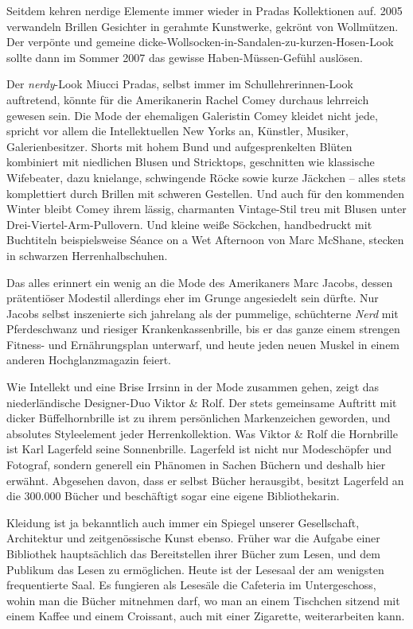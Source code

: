 \documentclass[output=paper]{langscibook}
\begin{document}
Seitdem kehren nerdige Elemente immer wieder in Pradas Kollektionen auf.
2005 verwandeln Brillen Gesichter in gerahmte Kunstwerke, gekrönt von
Wollmützen. Der verpönte und gemeine
dicke-Wollsocken-in-Sandalen-zu-kurzen-Hosen-Look sollte dann im Sommer
2007 das gewisse Haben-Müssen-Gefühl auslösen.

Der \emph{nerdy}-Look Miucci Pradas, selbst immer im
Schullehrerinnen-Look auftretend, könnte für die Amerikanerin Rachel
Comey durchaus lehrreich gewesen sein. Die Mode der ehemaligen
Galeristin Comey kleidet nicht jede, spricht vor allem die
Intellektuellen New Yorks an, Künstler, Musiker, Galerienbesitzer.
Shorts mit hohem Bund und aufgesprenkelten Blüten kombiniert mit
niedlichen Blusen und Stricktops, geschnitten wie klassische Wifebeater,
dazu knielange, schwingende Röcke sowie kurze Jäckchen -- alles stets
komplettiert durch Brillen mit schweren Gestellen. Und auch für den
kommenden Winter bleibt Comey ihrem lässig, charmanten Vintage-Stil treu
mit Blusen unter Drei-Viertel-Arm-Pullovern. Und kleine weiße Söckchen,
handbedruckt mit Buchtiteln beispielsweise Séance on a Wet Afternoon von
Marc McShane, stecken in schwarzen Herrenhalbschuhen.

Das alles erinnert ein wenig an die Mode des Amerikaners Marc Jacobs,
dessen prätentiöser Modestil allerdings eher im Grunge angesiedelt sein
dürfte. Nur Jacobs selbst inszenierte sich jahrelang als der pummelige,
schüchterne \emph{Nerd} mit Pferdeschwanz und riesiger
Krankenkassenbrille, bis er das ganze einem strengen Fitness- und
Ernährungsplan unterwarf, und heute jeden neuen Muskel in einem anderen
Hochglanzmagazin feiert.

Wie Intellekt und eine Brise Irrsinn in der Mode zusammen gehen, zeigt
das niederländische Designer-Duo Viktor \& Rolf. Der stets gemeinsame
Auftritt mit dicker Büffelhornbrille ist zu ihrem persönlichen
Markenzeichen geworden, und absolutes Styleelement jeder
Herrenkollektion. Was Viktor \& Rolf die Hornbrille ist Karl Lagerfeld
seine Sonnenbrille. Lagerfeld ist nicht nur Modeschöpfer und Fotograf,
sondern generell ein Phänomen in Sachen Büchern und deshalb hier
erwähnt. Abgesehen davon, dass er selbst Bücher herausgibt, besitzt
Lagerfeld an die 300.000 Bücher und beschäftigt sogar eine eigene
Bibliothekarin.

Kleidung ist ja bekanntlich auch immer ein Spiegel unserer Gesellschaft,
Architektur und zeitgenössische Kunst ebenso. Früher war die Aufgabe
einer Bibliothek hauptsächlich das Bereitstellen ihrer Bücher zum Lesen,
und dem Publikum das Lesen zu ermöglichen. Heute ist der Lesesaal der am
wenigsten frequentierte Saal. Es fungieren als Lesesäle die Cafeteria im
Untergeschoss, wohin man die Bücher mitnehmen darf, wo man an einem
Tischchen sitzend mit einem Kaffee und einem Croissant, auch mit einer
Zigarette, weiterarbeiten kann.
\end{document}
